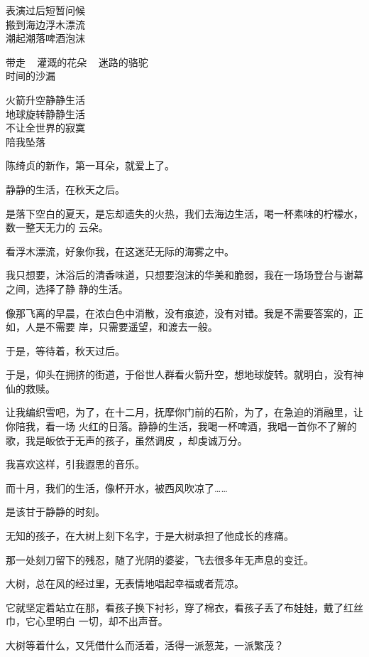 \documentclass[12pt,a4paper]{article}
\def\blankrev{\vspace{1ex}}									%
\begin{document}
		表演过后短暂问候 \\
		搬到海边浮木漂流 \\
		潮起潮落啤酒泡沫

		带走 ~ 灌溉的花朵 ~ 迷路的骆驼 \\
		时间的沙漏

		火箭升空静静生活 \\
		地球旋转静静生活 \\
		不让全世界的寂寞 \\
		陪我坠落
		\endlongpoem

		陈绮贞的新作，第一耳朵，就爱上了。

		静静的生活，在秋天之后。

		是落下空白的夏天，是忘却遗失的火热，我们去海边生活，喝一杯素味的柠檬水，数一整天无力的
	云朵。

		看浮木漂流，好象你我，在这迷茫无际的海雾之中。


		我只想要，沐浴后的清香味道，只想要泡沫的华美和脆弱，我在一场场登台与谢幕之间，选择了静
	静的生活。

		像那飞离的早晨，在浓白色中消散，没有痕迹，没有对错。我是不需要答案的，正如，人是不需要
	岸，只需要遥望，和渡去一般。


		于是，等待着，秋天过后。

		于是，仰头在拥挤的街道，于俗世人群看火箭升空，想地球旋转。就明白，没有神仙的救赎。

		让我编织雪吧，为了，在十二月，抚摩你门前的石阶，为了，在急迫的消融里，让你陪我，看一场
	火红的日落。静静的生活，我喝一杯啤酒，我唱一首你不了解的歌，我是皈依于无声的孩子，虽然调皮
	，却虔诚万分。


		\blankrev
		我喜欢这样，引我遐思的音乐。

		而十月，我们的生活，像杯开水，被西风吹凉了……

		是该甘于静静的时刻。

	\endwriting



		无知的孩子，在大树上刻下名字，于是大树承担了他成长的疼痛。

		那一处刻刀留下的残忍，随了光阴的婆娑，飞去很多年无声息的变迁。

		大树，总在风的经过里，无表情地唱起幸福或者荒凉。

		它就坚定着站立在那，看孩子换下衬衫，穿了棉衣，看孩子丢了布娃娃，戴了红丝巾，它心里明白
	一切，却不出声音。

		大树等着什么，又凭借什么而活着，活得一派葱茏，一派繁茂？
\end{document}
